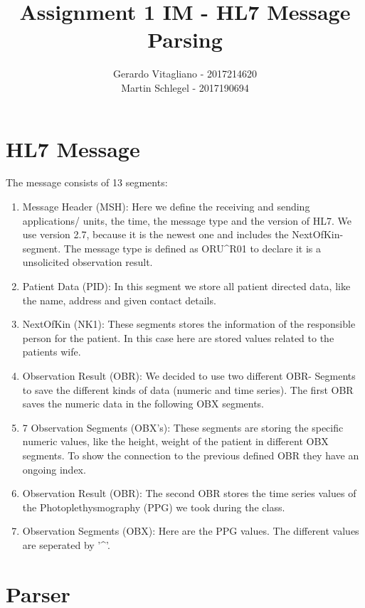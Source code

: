 \documentclass[a4paper,titlepage]{article}
\begin{document}
\title{Assignment 1 IM - HL7 Message Parsing}
\author{Gerardo Vitagliano - 2017214620 \\ Martin Schlegel - 2017190694 }
\date{\vspace{-5ex}}
\vfill
\maketitle
\clearpage
\section{HL7 Message}
The message consists of 13 segments:
\begin{enumerate}
  \item Message Header (MSH): Here we define the receiving and sending applications/ units, the time, the message type and the version of HL7. We use version 2.7, because it is the newest one and includes the NextOfKin-segment. The message type is defined as ORU\textasciicircum R01 to declare it is a unsolicited observation result.
  \item Patient Data (PID): In this segment we store all patient directed data, like the name, address and given contact details.
  \item NextOfKin (NK1): These segments stores the information of the responsible person for the patient. In this case here are stored values related to the patients wife.
  \item Observation Result (OBR): We decided to use two different OBR- Segments to save the different kinds of data (numeric and time series). The first OBR saves the numeric data in the following OBX segments.
  \item 7 Observation Segments (OBX's): These segments are storing the specific numeric values, like the height, weight of the patient in different OBX segments. To show the connection to the previous defined OBR they have an ongoing index.
  \item Observation Result (OBR): The second OBR stores the time series values of the Photoplethysmography (PPG) we took during the class.
  \item Observation Segments (OBX): Here are the PPG values. The different values are seperated by '\textasciicircum'.
\end{enumerate}

\section{Parser}
\end{document}
